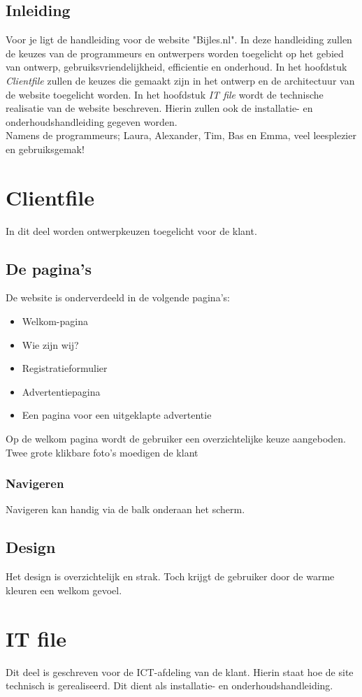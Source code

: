 \documentclass{report}
\begin{document}
\section*{Inleiding}
    Voor je ligt de handleiding voor de website "Bijles.nl". In deze handleiding zullen de keuzes van de programmeurs en ontwerpers worden toegelicht op het gebied van ontwerp, gebruiksvriendelijkheid, efficientie en onderhoud. In het hoofdstuk \emph{Clientfile} zullen de keuzes die gemaakt zijn in het ontwerp en de architectuur van de website toegelicht worden. In het hoofdstuk \emph{IT file} wordt de technische realisatie van de website beschreven. Hierin zullen ook de installatie- en onderhoudshandleiding gegeven worden.\\
    
    Namens de programmeurs; Laura, Alexander, Tim, Bas en Emma, veel leesplezier en gebruiksgemak!

\chapter{Clientfile}
    In dit deel worden ontwerpkeuzen toegelicht voor de klant.\\

    \section{De pagina's}
        De website is onderverdeeld in de volgende pagina's:
        \begin{itemize}
            \item Welkom-pagina
            \item Wie zijn wij?
            \item Registratieformulier
            \item Advertentiepagina
            \item Een pagina voor een uitgeklapte advertentie
        \end{itemize}
        
        Op de welkom pagina wordt de gebruiker een overzichtelijke keuze aangeboden. Twee grote klikbare foto's moedigen de klant 
    
        \subsection{Navigeren}
            Navigeren kan handig via de balk onderaan het scherm. 
    
    \section{Design}
        Het design is overzichtelijk en strak. Toch krijgt de gebruiker door de warme kleuren een welkom gevoel.

\chapter{IT file}
    Dit deel is geschreven voor de ICT-afdeling van de klant. Hierin staat hoe de site technisch is gerealiseerd. Dit dient als installatie- en onderhoudshandleiding.
\end{document}
